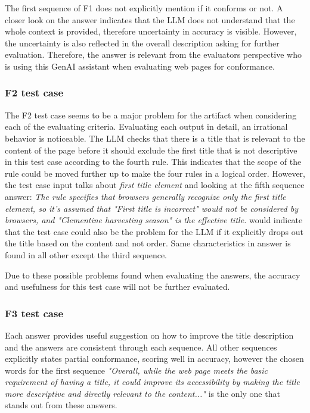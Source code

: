 The first sequence of F1 does not explicitly mention if it conforms or not. A closer look on the answer indicates that the LLM does not understand that the whole context is provided, therefore uncertainty in accuracy is visible. However, the uncertainty is also reflected in the overall description asking for further evaluation. Therefore, the answer is relevant from the evaluators perspective who is using this GenAI assistant when evaluating web pages for conformance.

\subsubsection{F2 test case}

The F2 test case seems to be a major problem for the artifact when considering each of the evaluating criteria. Evaluating each output in detail, an irrational behavior is noticeable. The LLM checks that there is a title that is relevant to the content of the page before it should exclude the first title that is not descriptive in this test case according to the fourth rule. This indicates that the scope of the rule could be moved further up to make the four rules in a logical order. However, the test case input talks about \textit{first title element} and looking at the fifth sequence answer: \textit{The rule specifies that browsers generally recognize only the first title element, so it's assumed that "First title is incorrect" would not be considered by browsers, and "Clementine harvesting season" is the effective title.} would indicate that the test case could also be the problem for the LLM if it explicitly drops out the title based on the content and not order. Same characteristics in answer is found in all other except the third sequence.

Due to these possible problems found when evaluating the answers, the accuracy and usefulness for this test case will not be further evaluated.

\subsubsection{F3 test case}

Each answer provides useful suggestion on how to improve the title description and the answers are consistent through each sequence. All other sequences explicitly states partial conformance, scoring well in accuracy, however the chosen words for the first sequence \textit{"Overall, while the web page meets the basic requirement of having a title, it could improve its accessibility by making the title more descriptive and directly relevant to the content..."} is the only one that stands out from these answers.